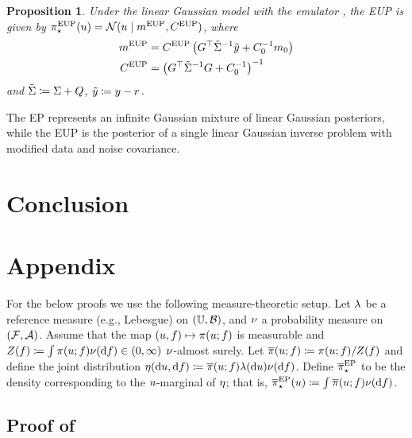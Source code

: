\documentclass[12pt]{article}
\newtheorem{prop}{Proposition}
\begin{document}
\begin{prop}
Under the linear Gaussian model  with the emulator ,
the EUP is given by ${\pi}_{\star}^{\mathrm{EUP}}(u) = \mathcal{N}(u \mid m^{\mathrm{EUP}}, C^{\mathrm{EUP}})$, where
\begin{align}
m^{\mathrm{EUP}} &= C^{\mathrm{EUP}} \left(G^\top \tilde{\Sigma}^{-1}\tilde{y} + C_0^{-1}m_0 \right) 
\label{eq:lin-Gauss-post-moments} \\
C^{\mathrm{EUP}} &= \left(G^\top \tilde{\Sigma}^{-1}G + C_0^{-1} \right)^{-1} \nonumber
\end{align}
and $\tilde{\Sigma} \coloneqq \Sigma + Q$, $\tilde{y} \coloneqq y - r$.
\end{prop}

The EP represents an infinite Gaussian mixture of linear Gaussian posteriors, while the EUP is the posterior
of a single linear Gaussian inverse problem with modified data and noise covariance.

\section{Conclusion} \label{sec:conclusion}





\section{Appendix}

For the below proofs we use the following measure-theoretic setup.
Let $\lambda$ be a reference measure (e.g., Lebesgue) on $(\mathbb{U}, \mathcal{B})$,
and $\nu$ a probability measure on $(\mathcal{F}, \mathcal{A})$. Assume that 
the map $(u, f) \mapsto \pi(u; f)$ is measurable
and $\normCst(\targetTraj) \Def \int \postDens(\Par; \targetTraj) \emDist(\d\targetTraj) \in (0,\infty)$
$\nu$-almost surely. Let $\overline{\pi}(u; f) \coloneqq \pi(u; f) / Z(f)$
and define the joint distribution 
$\emJoint(\d\Par, \d\targetTraj) \Def \postDensNorm(\Par; \targetTraj) \refMeas(\d\Par)\emDist(\d\targetTraj)$.
Define ${\overline{\pi}}_{\star}^{\mathrm{EP}}$ to be the density corresponding to the $u$-marginal of $\eta$; that is,
$\postApproxEP(\Par) \Def \int \postDensNorm(\Par; \targetTraj) \emDist(\d\targetTraj)$. 

\subsection{Proof of }
\end{document}
